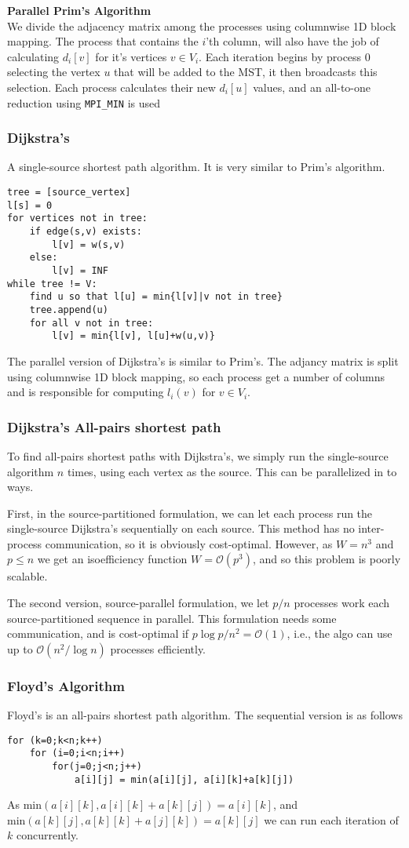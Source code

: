 \documentclass[a4paper,10pt,twoside,twocolumn]{article}
\renewcommand{\(}{\left(}
\renewcommand{\)}{\right)}
\newcommand{\header}[1]{\subsubsection*{#1} \vspace{-0.2cm}}
\begin{document}
\textbf{Parallel Prim's Algorithm} \\
We divide the adjacency matrix among the processes using columnwise 1D block mapping. The process that contains the $i$'th column, will also have the job of calculating $d_i[v]$ for it's vertices $v\in V_i$. Each iteration begins by process 0 selecting the vertex $u$ that will be added to the MST, it then broadcasts this selection. Each process calculates their new $d_i[u]$ values, and an all-to-one reduction using \verb+MPI_MIN+ is used

\header{Dijkstra's}
A single-source shortest path algorithm. It is very similar to Prim's algorithm.
\begin{verbatim}
tree = [source_vertex]
l[s] = 0
for vertices not in tree:
    if edge(s,v) exists:
        l[v] = w(s,v)
    else:
        l[v] = INF
while tree != V:
    find u so that l[u] = min{l[v]|v not in tree}
    tree.append(u)
    for all v not in tree:
        l[v] = min{l[v], l[u]+w(u,v)}
\end{verbatim}
The parallel version of Dijkstra's is similar to Prim's. The adjancy matrix is split using columnwise 1D block mapping, so each process get a number of columns and is responsible for computing $l_i(v)$ for $v \in V_i$.

\newpage

\header{Dijkstra's All-pairs shortest path}
To find all-pairs shortest paths with Dijkstra's, we simply run the single-source algorithm $n$ times, using each vertex as the source. This can be parallelized in to ways. 

First, in the source-partitioned formulation, we can let each process run the single-source Dijkstra's sequentially on each source. This method has no inter-process communication, so it is obviously cost-optimal. However, as $W=n^3$ and $p\leq n$ we get an isoefficiency function $W = \mathcal{O}(p^3)$, and so this problem is poorly scalable.

The second version, source-parallel formulation, we let $p/n$ processes work each source-partitioned sequence in parallel. This formulation needs some communication, and is cost-optimal  if $p\log p/n^2 = \mathcal{O}(1)$, i.e., the algo can use up to $\mathcal{O}(n^2/\log n)$ processes efficiently.

\header{Floyd's Algorithm}
Floyd's is an all-pairs shortest path algorithm. The sequential version is as follows
\begin{verbatim}
for (k=0;k<n;k++)
    for (i=0;i<n;i++)
        for(j=0;j<n;j++)
            a[i][j] = min(a[i][j], a[i][k]+a[k][j])
\end{verbatim}
As $\mbox{min}(a[i][k],a[i][k]+a[k][j]) = a[i][k]$, and $\mbox{min}(a[k][j],a[k][k]+a[j][k]) = a[k][j]$ we can run each iteration of $k$ concurrently.
\end{document}
